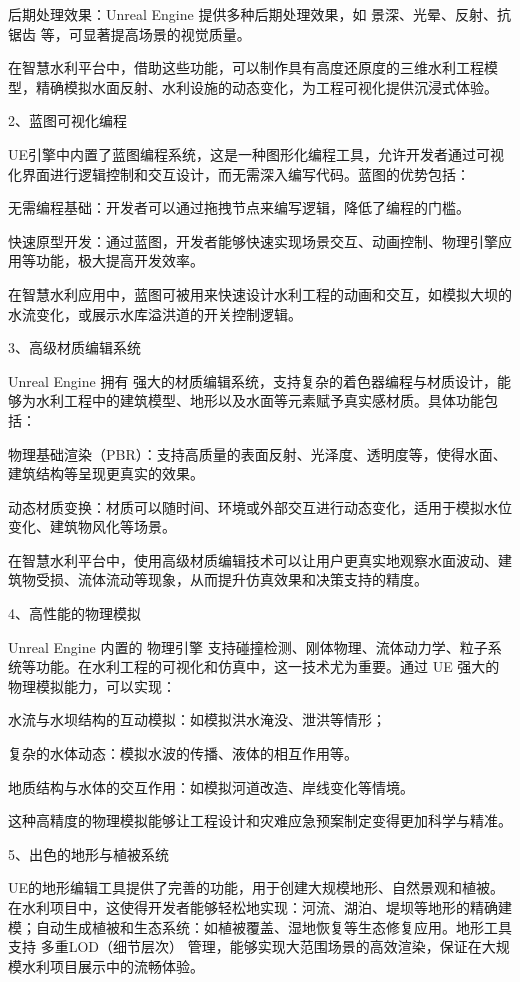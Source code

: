 后期处理效果：Unreal Engine 提供多种后期处理效果，如 景深、光晕、反射、抗锯齿 等，可显著提高场景的视觉质量。

在智慧水利平台中，借助这些功能，可以制作具有高度还原度的三维水利工程模型，精确模拟水面反射、水利设施的动态变化，为工程可视化提供沉浸式体验。

2、蓝图可视化编程

UE引擎中内置了蓝图编程系统，这是一种图形化编程工具，允许开发者通过可视化界面进行逻辑控制和交互设计，而无需深入编写代码。蓝图的优势包括：

无需编程基础：开发者可以通过拖拽节点来编写逻辑，降低了编程的门槛。

快速原型开发：通过蓝图，开发者能够快速实现场景交互、动画控制、物理引擎应用等功能，极大提高开发效率。

在智慧水利应用中，蓝图可被用来快速设计水利工程的动画和交互，如模拟大坝的水流变化，或展示水库溢洪道的开关控制逻辑。

3、高级材质编辑系统

Unreal Engine 拥有 强大的材质编辑系统，支持复杂的着色器编程与材质设计，能够为水利工程中的建筑模型、地形以及水面等元素赋予真实感材质。具体功能包括：

物理基础渲染（PBR）：支持高质量的表面反射、光泽度、透明度等，使得水面、建筑结构等呈现更真实的效果。

动态材质变换：材质可以随时间、环境或外部交互进行动态变化，适用于模拟水位变化、建筑物风化等场景。

在智慧水利平台中，使用高级材质编辑技术可以让用户更真实地观察水面波动、建筑物受损、流体流动等现象，从而提升仿真效果和决策支持的精度。

4、高性能的物理模拟

Unreal Engine 内置的 物理引擎 支持碰撞检测、刚体物理、流体动力学、粒子系统等功能。在水利工程的可视化和仿真中，这一技术尤为重要。通过 UE 强大的物理模拟能力，可以实现：

水流与水坝结构的互动模拟：如模拟洪水淹没、泄洪等情形；

复杂的水体动态：模拟水波的传播、液体的相互作用等。

地质结构与水体的交互作用：如模拟河道改造、岸线变化等情境。

这种高精度的物理模拟能够让工程设计和灾难应急预案制定变得更加科学与精准。

5、出色的地形与植被系统

UE的地形编辑工具提供了完善的功能，用于创建大规模地形、自然景观和植被。在水利项目中，这使得开发者能够轻松地实现：河流、湖泊、堤坝等地形的精确建模；自动生成植被和生态系统：如植被覆盖、湿地恢复等生态修复应用。地形工具支持 多重LOD（细节层次） 管理，能够实现大范围场景的高效渲染，保证在大规模水利项目展示中的流畅体验。

